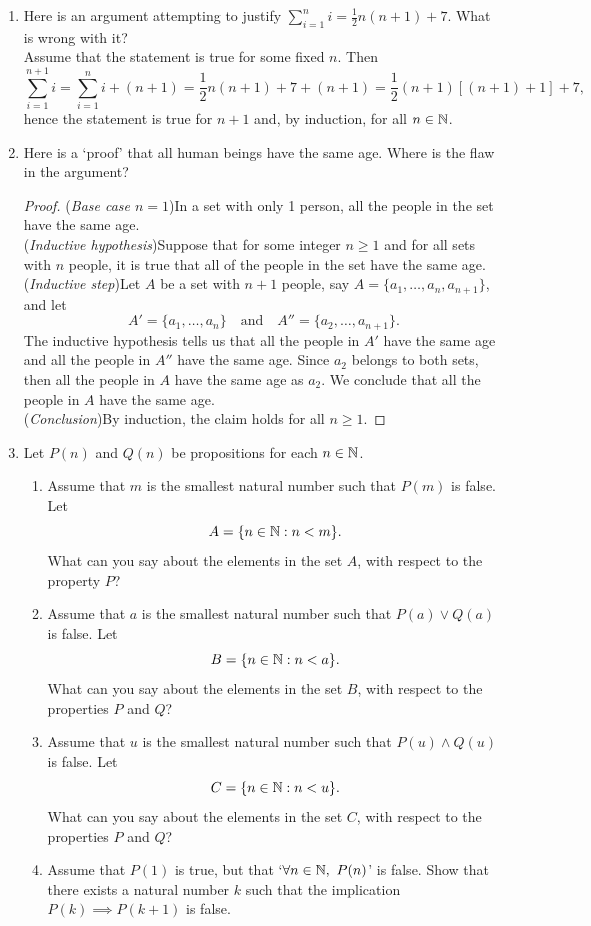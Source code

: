 \begin{exercises}{}{}
\begin{enumerate}
  \item Here is an argument attempting to justify $\sum\limits_{i=1}^ni=\frac 12n(n+1)+7$. What is wrong with it?\\[5pt]
	Assume that the statement is true for some fixed $n$. Then
	\[\sum_{i=1}^{n+1}i=\sum_{i=1}^ni+(n+1)=\frac 12n(n+1)+7+(n+1)=\frac 12(n+1)[(n+1)+1]+7,\]
	hence the statement is true for $n+1$ and, by induction, for all $n\in\mathbb{N}$.\pagebreak[4]
	
	\item Here is a `proof' that all human beings have the same age. Where is the flaw in the argument?
	\begin{proof}
	(\emph{Base case $n=1$})\quad In a set with only 1 person, all the people in the set have the same age.\\[2pt]
	(\emph{Inductive hypothesis})\quad Suppose that for some integer $n\ge 1$ and for all sets with $n$ people, it is true that all of the people in the set have the same age.\\[2pt]
	(\emph{Inductive step})\quad Let $A$ be a set with $n+1$ people, say $A=\{a_1,\dots,a_n,a_{n+1}\}$, and let
		\[A'=\{a_1,\dots,a_n\}\quad\text{and}\quad A''=\{a_2,\dots,a_{n+1}\}.\]
		The inductive hypothesis tells us that all the people in $A'$ have the same age and all the people in $A''$ have the same age. Since $a_2$ belongs to both sets, then all the people in $A$ have the same age as $a_2$. We conclude that all the people in $A$ have the same age.\\[2pt]
	(\emph{Conclusion})\quad By induction, the claim holds for all $n\ge 1$.
	\end{proof}
	
	\item Let $P(n)$ and $Q(n)$ be propositions for each $n\in\mathbb{N}$.
	\begin{enumerate}
		\item Assume that $m$ is the smallest natural number such that $P(m)$ is false. Let
		\[A=\{n\in\mathbb{N}:n<m\}.\]
		What can you say about the elements in the set $A$, with respect to the property $P$?
		\item Assume that $a$ is the smallest natural number such that $P(a)\vee Q(a)$ is false. Let
		\[B=\{n\in\mathbb{N}:n<a\}.\]
		What can you say about the elements in the set $B$, with respect to the properties $P$ and $Q$?
		\item Assume that $u$ is the smallest natural number such that $P(u)\wedge Q(u)$ is false. Let
		\[C=\{n\in\mathbb{N}:n<u\}.\]
		What can you say about the elements in the set $C$, with respect to the properties $P$ and $Q$?
		\item Assume that $P(1)$ is true, but that `$\forall n\in\N,\ P(n)$' is false. Show that there exists a natural number $k$ such that the implication $P(k)\implies P(k+1)$ is false.
	\end{enumerate}
	

\end{enumerate}
\end{exercises}
